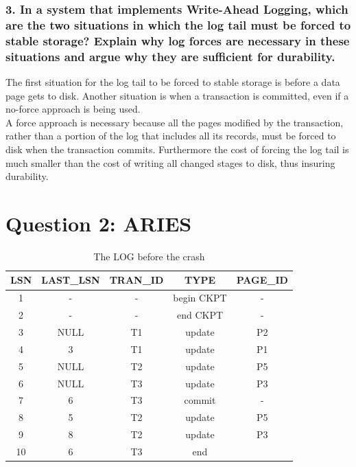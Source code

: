 \documentclass{article}      %
\begin{document}
\subsubsection*{3.  In a system that implements Write-Ahead Logging, which are the two situations in which the log tail must be forced to stable storage? Explain why log forces are necessary in these situations and argue why they are sufficient for durability.}
The first situation for the log tail to be forced to stable storage is before a data page gets to disk. Another situation is when a transaction is committed, even if a no-force approach is being used. \\

A force approach is necessary because all the pages modified by the transaction, rather than a portion of the log that includes all its records, must be forced to disk when the transaction commits. Furthermore the cost of forcing the log tail is much smaller than the cost of writing all changed stages to disk, thus insuring durability.\\

\section*{Question 2: ARIES}

\begin{table}[h]
\begin{center}
\begin{tabular}{|c|c|c|c|c|}
\hline
\textbf{LSN} & \textbf{LAST\_LSN} & \textbf{TRAN\_ID} & \textbf{TYPE} & \textbf{PAGE\_ID} \\ \hline
1            & -                  & -                 & begin CKPT    & -                 \\ 
2            & -                  & -                 & end CKPT      & -                 \\ 
3            & NULL               & T1                & update        & P2                \\ 
4            & 3                  & T1                & update        & P1                \\ 
5            & NULL               & T2                & update        & P5                \\
6            & NULL               & T3                & update        & P3                \\
7            & 6                  & T3                & commit        & -                 \\ 
8            & 5                  & T2                & update        & P5                \\
9            & 8                  & T2                & update        & P3                \\ 
10           & 6                  & T3                & end           &                   \\ \hline
\end{tabular}
\caption{The LOG before the crash}
\label{The LOG before the crash}
\end{center}
\end{table}
\end{document}
